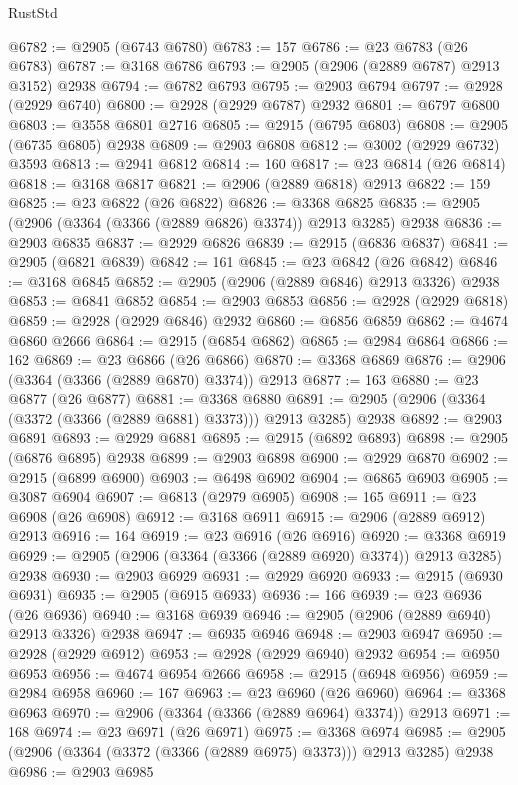 \begin{lexlean}{RustStd}
\begin{coremodule}
{\begin{coremodule}
{{{{{{{{{{{{{{{{{{{{{{{{{{{{{{{{{{{{{{{{{{{{{{{{{{{{{{{{{{{{{{{{{{{{{{{{{{{{{{@6782 := @2905 (@6743 @6780)
@6783 := 157
@6786 := @23 @6783 (@26 @6783)
@6787 := @3168 @6786
@6793 := @2905 (@2906 (@2889 @6787) @2913 @3152) @2938
@6794 := @6782 @6793
@6795 := @2903 @6794
@6797 := @2928 (@2929 @6740)
@6800 := @2928 (@2929 @6787) @2932
@6801 := @6797 @6800
@6803 := @3558 @6801 @2716
@6805 := @2915 (@6795 @6803)
@6808 := @2905 (@6735 @6805) @2938
@6809 := @2903 @6808
@6812 := @3002 (@2929 @6732) @3593
@6813 := @2941 @6812
@6814 := 160
@6817 := @23 @6814 (@26 @6814)
@6818 := @3168 @6817
@6821 := @2906 (@2889 @6818) @2913
@6822 := 159
@6825 := @23 @6822 (@26 @6822)
@6826 := @3368 @6825
@6835 := @2905 (@2906 (@3364 (@3366 (@2889 @6826) @3374)) @2913 @3285) @2938
@6836 := @2903 @6835
@6837 := @2929 @6826
@6839 := @2915 (@6836 @6837)
@6841 := @2905 (@6821 @6839)
@6842 := 161
@6845 := @23 @6842 (@26 @6842)
@6846 := @3168 @6845
@6852 := @2905 (@2906 (@2889 @6846) @2913 @3326) @2938
@6853 := @6841 @6852
@6854 := @2903 @6853
@6856 := @2928 (@2929 @6818)
@6859 := @2928 (@2929 @6846) @2932
@6860 := @6856 @6859
@6862 := @4674 @6860 @2666
@6864 := @2915 (@6854 @6862)
@6865 := @2984 @6864
@6866 := 162
@6869 := @23 @6866 (@26 @6866)
@6870 := @3368 @6869
@6876 := @2906 (@3364 (@3366 (@2889 @6870) @3374)) @2913
@6877 := 163
@6880 := @23 @6877 (@26 @6877)
@6881 := @3368 @6880
@6891 := @2905 (@2906 (@3364 (@3372 (@3366 (@2889 @6881) @3373))) @2913 @3285) @2938
@6892 := @2903 @6891
@6893 := @2929 @6881
@6895 := @2915 (@6892 @6893)
@6898 := @2905 (@6876 @6895) @2938
@6899 := @2903 @6898
@6900 := @2929 @6870
@6902 := @2915 (@6899 @6900)
@6903 := @6498 @6902
@6904 := @6865 @6903
@6905 := @3087 @6904
@6907 := @6813 (@2979 @6905)
@6908 := 165
@6911 := @23 @6908 (@26 @6908)
@6912 := @3168 @6911
@6915 := @2906 (@2889 @6912) @2913
@6916 := 164
@6919 := @23 @6916 (@26 @6916)
@6920 := @3368 @6919
@6929 := @2905 (@2906 (@3364 (@3366 (@2889 @6920) @3374)) @2913 @3285) @2938
@6930 := @2903 @6929
@6931 := @2929 @6920
@6933 := @2915 (@6930 @6931)
@6935 := @2905 (@6915 @6933)
@6936 := 166
@6939 := @23 @6936 (@26 @6936)
@6940 := @3168 @6939
@6946 := @2905 (@2906 (@2889 @6940) @2913 @3326) @2938
@6947 := @6935 @6946
@6948 := @2903 @6947
@6950 := @2928 (@2929 @6912)
@6953 := @2928 (@2929 @6940) @2932
@6954 := @6950 @6953
@6956 := @4674 @6954 @2666
@6958 := @2915 (@6948 @6956)
@6959 := @2984 @6958
@6960 := 167
@6963 := @23 @6960 (@26 @6960)
@6964 := @3368 @6963
@6970 := @2906 (@3364 (@3366 (@2889 @6964) @3374)) @2913
@6971 := 168
@6974 := @23 @6971 (@26 @6971)
@6975 := @3368 @6974
@6985 := @2905 (@2906 (@3364 (@3372 (@3366 (@2889 @6975) @3373))) @2913 @3285) @2938
@6986 := @2903 @6985
}}}}}}}}}}}}}}}}}}}}}}}}}}}}}}}}}}}}}}}}}}}}}}}}}}}}}}}}}}}}}}}}}}}}}}}}}}}}}}
\end{coremodule}}
\end{coremodule}
\end{lexlean}
